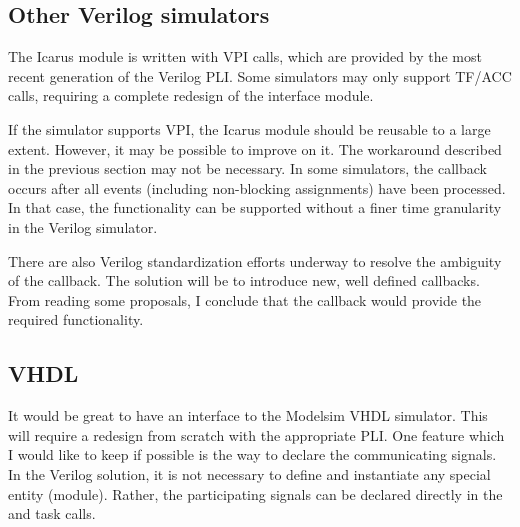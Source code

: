 \subsection{Other Verilog simulators}

The Icarus module is written with VPI calls, which are provided by the
most recent generation of the Verilog PLI. Some simulators may only
support TF/ACC calls, requiring a complete redesign of the interface
module.

If the simulator supports VPI, the Icarus module should be reusable to
a large extent. However, it may be possible to improve on it.  The
workaround described in the previous section may not be necessary. In
some simulators, the  callback occurs after all
events (including non-blocking assignments) have been processed. In
that case, the functionality can be supported without a finer time
granularity in the Verilog simulator.

There are also Verilog standardization efforts underway to resolve the
ambiguity of the  callback. The solution will be
to introduce new, well defined callbacks. From reading some proposals,
I conclude that the  callback would provide the
required functionality.

\subsection{VHDL}

It would be great to have an interface to the Modelsim VHDL
simulator. This will require a redesign from scratch with the
appropriate PLI.  One feature which I would like to keep if possible
is the way to declare the communicating signals.  In the Verilog
solution, it is not necessary to define and instantiate any special
entity (module). Rather, the participating signals can be declared
directly in the  and  task calls.
